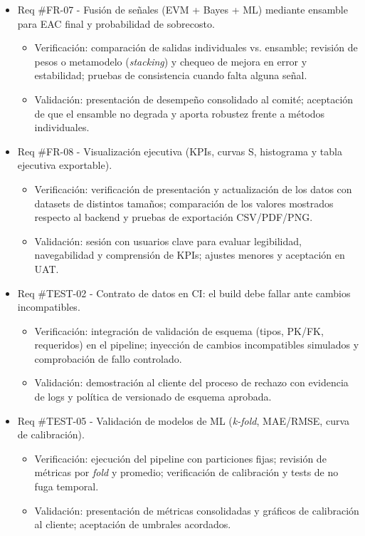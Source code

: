 \documentclass[12pt]
{charter}
\begin{document}
\begin{itemize}
\item Req \#FR-07 - Fusión de señales (EVM + Bayes + ML) mediante ensamble para EAC final y probabilidad de sobrecosto.
  \begin{itemize}
    \item Verificación: comparación de salidas individuales vs. ensamble; revisión de pesos o metamodelo (\textit{stacking}) y chequeo de mejora en error y estabilidad; pruebas de consistencia cuando falta alguna señal.
    \item Validación: presentación de desempeño consolidado al comité; aceptación de que el ensamble no degrada y aporta robustez frente a métodos individuales.
  \end{itemize}

\item Req \#FR-08 - Visualización ejecutiva (KPIs, curvas S, histograma y tabla ejecutiva exportable).
  \begin{itemize}
    \item Verificación: verificación de presentación y actualización de los datos con datasets de distintos tamaños; comparación de los valores mostrados respecto al backend y pruebas de exportación CSV/PDF/PNG.
    \item Validación: sesión con usuarios clave para evaluar legibilidad, navegabilidad y comprensión de KPIs; ajustes menores y aceptación en UAT.
  \end{itemize}

\item Req \#TEST-02 - Contrato de datos en CI: el build debe fallar ante cambios incompatibles.
  \begin{itemize}
    \item Verificación: integración de validación de esquema (tipos, PK/FK, requeridos) en el pipeline; inyección de cambios incompatibles simulados y comprobación de fallo controlado.
    \item Validación: demostración al cliente del proceso de rechazo con evidencia de logs y política de versionado de esquema aprobada.
  \end{itemize}

\item Req \#TEST-05 - Validación de modelos de ML (\textit{k-fold}, MAE/RMSE, curva de calibración).
  \begin{itemize}
    \item Verificación: ejecución del pipeline con particiones fijas; revisión de métricas por \textit{fold} y promedio; verificación de calibración y tests de no fuga temporal.
    \item Validación: presentación de métricas consolidadas y gráficos de calibración al cliente; aceptación de umbrales acordados.
  \end{itemize}


\end{itemize}
\end{document}
